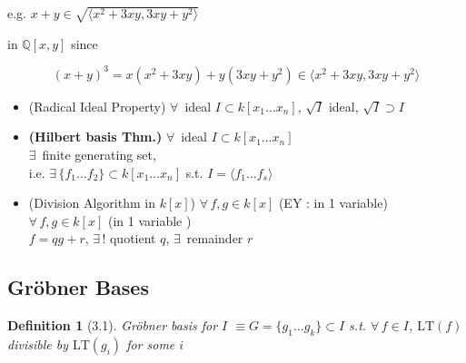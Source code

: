 \documentclass[10pt]{amsart}
\newtheorem{definition}{Definition}
\begin{document}
\begin{multicols*}{2}
e.g. $x+y \in \sqrt{ \langle x^2 + 3 xy , 3xy + y^2 \rangle }$

in $\mathbb{Q}[x,y]$ since 

\[
(x+y)^3 =x(x^2 + 3xy) + y(3xy + y^2) \in \langle x^2 + 3xy, 3xy + y^2\rangle
\]






\begin{itemize}
\item (Radical Ideal Property) $\forall \, $ ideal $I\subset k[x_1 \dots x_n]$, $\sqrt{I}$ ideal, $\sqrt{I} \supset I$
\item \textbf{(Hilbert basis Thm.)} $\forall \, $ ideal $I\subset k[x_1\dots x_n]$ \\
$\exists \, $ finite generating set, \\
i.e. $\exists \, \lbrace f_1 \dots f_2 \rbrace \subset k [x_1 \dots x_n]$ s.t. $I=\langle f_1 \dots f_s \rangle$
\item (Division Algorithm in $k[x]$) $\forall \, f,g \in  k[x]$ (EY : in 1 variable) \\
$\forall \, f, g \in k[x]$ (in 1 variable )\\
$f= qg + r$, $\exists \, !$ quotient $q$, $\exists \, $ remainder $r$
\end{itemize}

\subsection{}

\subsection{Gr\"obner Bases}

\begin{definition}[3.1]
  Gr\"obner basis for $I$ $\equiv G = \lbrace g_1 \dots g_k \rbrace \subset I$ s.t. $\forall \, f \in I$, $\text{LT}(f)$ divisible by $\text{LT}(g_i)$ for some $i$
\end{definition}


\end{multicols*}
\end{document}
